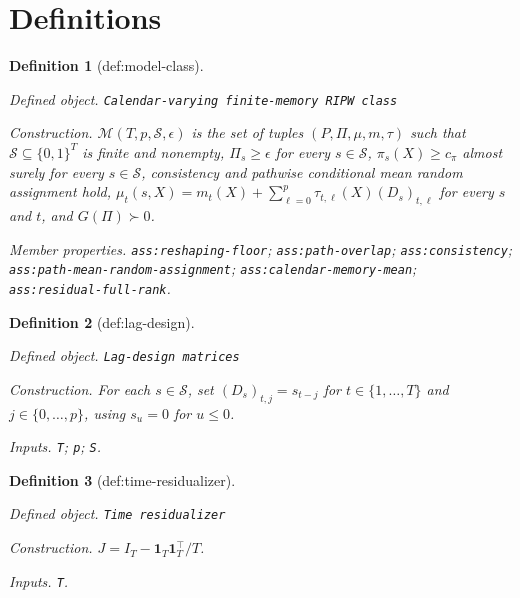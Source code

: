 \documentclass{article}
\newtheorem{definition}{Definition}
\begin{document}
\section{Definitions}

\begin{definition}[def:model-class]\label{def:model-class}
\par\smallskip\noindent\emph{Defined object.} \texttt{Calendar-\allowbreak{}varying finite-\allowbreak{}memory RIPW class}
\par\smallskip\noindent\emph{Construction.} \(\mathcal M(T,p,\mathcal S,\epsilon)\) is the set of tuples \((P,\Pi,\mu,m,\tau)\) such that \(\mathcal S\subseteq\{0,1\}^{T}\) is finite and nonempty, \(\Pi_s\geq\epsilon\) for every \(s\in\mathcal S\), \(\pi_s(X)\geq c_{\pi}\) almost surely for every \(s\in\mathcal S\), consistency and pathwise conditional mean random assignment hold, \(\mu_t(s,X)=m_t(X)+\sum_{\ell=0}^{p}\tau_{t,\ell}(X)(D_s)_{t,\ell}\) for every \(s\) and \(t\), and \(G(\Pi)\succ0\).
\par\smallskip\noindent\emph{Member properties.} \texttt{ass:\allowbreak{}reshaping-\allowbreak{}floor}; \texttt{ass:\allowbreak{}path-\allowbreak{}overlap}; \texttt{ass:\allowbreak{}consistency}; \texttt{ass:\allowbreak{}path-\allowbreak{}mean-\allowbreak{}random-\allowbreak{}assignment}; \texttt{ass:\allowbreak{}calendar-\allowbreak{}memory-\allowbreak{}mean}; \texttt{ass:\allowbreak{}residual-\allowbreak{}full-\allowbreak{}rank}.
\end{definition}

\begin{definition}[def:lag-design]\label{def:lag-design}
\par\smallskip\noindent\emph{Defined object.} \texttt{Lag-\allowbreak{}design matrices}
\par\smallskip\noindent\emph{Construction.} For each \(s\in\mathcal S\), set \((D_s)_{t,j}=s_{t-j}\) for \(t\in\{1,\ldots,T\}\) and \(j\in\{0,\ldots,p\}\), using \(s_u=0\) for \(u\le0\).
\par\smallskip\noindent\emph{Inputs.} \texttt{T}; \texttt{p}; \texttt{S}.
\end{definition}

\begin{definition}[def:time-residualizer]\label{def:time-residualizer}
\par\smallskip\noindent\emph{Defined object.} \texttt{Time residualizer}
\par\smallskip\noindent\emph{Construction.} \(J=I_T-\mathbf 1_T\mathbf 1_T^{\top}/T\).
\par\smallskip\noindent\emph{Inputs.} \texttt{T}.
\end{definition}
\end{document}
